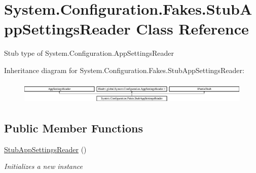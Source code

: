 \hypertarget{class_system_1_1_configuration_1_1_fakes_1_1_stub_app_settings_reader}{\section{System.\-Configuration.\-Fakes.\-Stub\-App\-Settings\-Reader Class Reference}
\label{class_system_1_1_configuration_1_1_fakes_1_1_stub_app_settings_reader}
}


Stub type of System.\-Configuration.\-App\-Settings\-Reader 


Inheritance diagram for System.\-Configuration.\-Fakes.\-Stub\-App\-Settings\-Reader\-:\begin{figure}[H]
\begin{center}
\leavevmode
\includegraphics[height=1.091618cm]{class_system_1_1_configuration_1_1_fakes_1_1_stub_app_settings_reader}
\end{center}
\end{figure}
\subsection*{Public Member Functions}
\begin{DoxyCompactItemize}
\item 
\hyperlink{class_system_1_1_configuration_1_1_fakes_1_1_stub_app_settings_reader_a4fb54bc9789057a3cbe7c7bd59e8a353}{Stub\-App\-Settings\-Reader} ()
\begin{DoxyCompactList}\small\item\em Initializes a new instance\end{DoxyCompactList}\end{DoxyCompactItemize}
